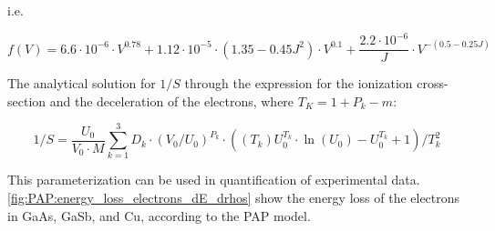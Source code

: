 
i.e.

\begin{equation}
    f(V) = 6.6 \cdot 10^{-6}\cdot V^{0.78} + 1.12\cdot 10^{-5}\cdot (1.35 - 0.45 J^2) \cdot V^{0.1} + \frac{2.2 \cdot 10^{-6}}{J} \cdot V^{-(0.5-0.25J)}
\end{equation}




The analytical solution for $1/S$ through the expression for the ionization cross-section and the deceleration of the electrons, where $ T_K = 1 + P_k - m$:

\begin{equation}
    1/S = \frac{U_0}{V_0 \cdot M} \sum \limits_{k=1}^{3} D_k \cdot (V_0/U_0)^{P_k} \cdot ((T_k)U_0^{T_k} \cdot \ln(U_0)-U_0^{T_k}+1)/T_k^2
\end{equation}




This parameterization can be used in quantification of experimental data.
\cref{fig:PAP:energy_loss_electrons_dE_drhos} show the energy loss of the electrons in GaAs, GaSb, and Cu, according to the PAP model.


